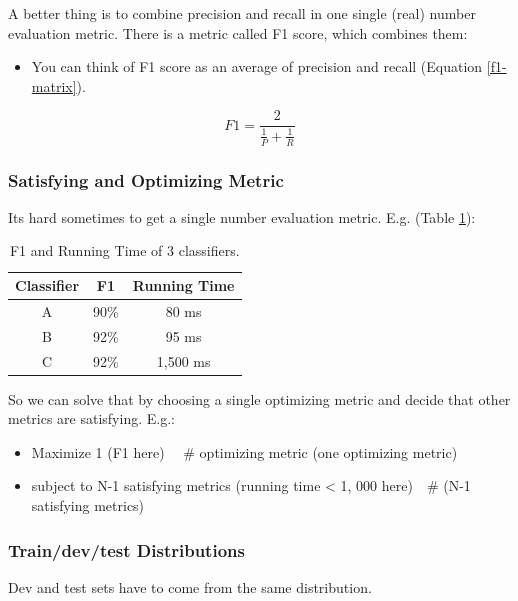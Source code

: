 A better thing is to combine precision and recall in one single (real) number evaluation metric. There is a metric called F1 score, which combines them:

\begin{itemize}
    \item You can think of F1 score as an average of precision and recall (Equation \ref{f1-matrix}).
\end{itemize}

\begin{equation}\label{f1-matrix}
    F1 = \frac{2}{\frac{1}{P} + \frac{1}{R}}
\end{equation}

\subsubsection{Satisfying and Optimizing Metric}
Its hard sometimes to get a single number evaluation metric. E.g. (Table \ref{pr-mixclassify}):

\begin{table}[!htbp]
    \centering
    \begin{tabular}{c|c|c}
        \hline
        Classifier & F1 & Running Time \\
        \hline
        A & 90\% & 80 ms\\
        B & 92\% & 95 ms\\
        C & 92\% & 1,500 ms\\
        \hline
    \end{tabular}
    \caption{F1 and Running Time of 3 classifiers.}
    \label{pr-mixclassify}
\end{table}

So we can solve that by choosing a single optimizing metric and decide that other metrics are satisfying. E.g.:

\begin{itemize}
    \item Maximize 1 (F1 here) \ \ \# optimizing metric (one optimizing metric)
    \item subject to N-1 satisfying metrics (running time < 1, 000 here)\ \ \# (N-1 satisfying metrics)
\end{itemize}

\subsubsection{Train/dev/test Distributions}
Dev and test sets have to come from the same distribution.

